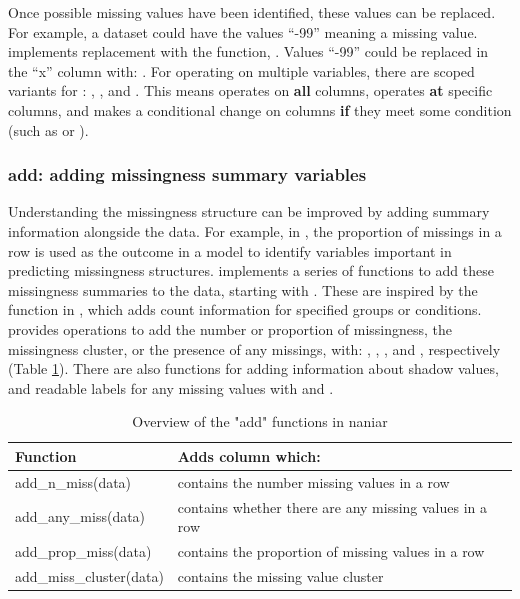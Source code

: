 \documentclass[
]{jss}
\begin{document}
Once possible missing values have been identified, these values can be replaced. For example, a dataset could have the values ``-99'' meaning a missing value.  implements replacement with the function, . Values ``-99'' could be replaced in the ``x'' column with: . For operating on multiple variables, there are scoped variants for : , , and . This means  operates on \textbf{all} columns,  operates \textbf{at} specific columns, and  makes a conditional change on columns \textbf{if} they meet some condition (such as  or ).

\hypertarget{verbs-add-cols}{%
\subsubsection{add: adding missingness summary variables}\label{verbs-add-cols}}

Understanding the missingness structure can be improved by adding summary information alongside the data. For example, in \citep{Tierney2015}, the proportion of missings in a row is used as the outcome in a model to identify variables important in predicting missingness structures.  implements a series of functions to add these missingness summaries to the data, starting with . These are inspired by the  function in , which adds count information for specified groups or conditions.  provides operations to add the number or proportion of missingness, the missingness cluster, or the presence of any missings, with: , , , and , respectively (Table \ref{tab:add-missing-info}). There are also functions for adding information about shadow values, and readable labels for any missing values with  and .

\begin{CodeChunk}
\begin{table}

\caption{\label{tab:add-missing-info}Overview of the "add" functions in naniar}
\centering
\begin{tabular}[t]{l|l}
\hline
Function & Adds column which:\\
\hline
add\_n\_miss(data) & contains the number missing values in a row\\
\hline
add\_any\_miss(data) & contains whether there are any missing values in a row\\
\hline
add\_prop\_miss(data) & contains the proportion of missing values in a row\\
\hline
add\_miss\_cluster(data) & contains the missing value cluster\\
\hline
\end{tabular}
\end{table}

\end{CodeChunk}
\end{document}
